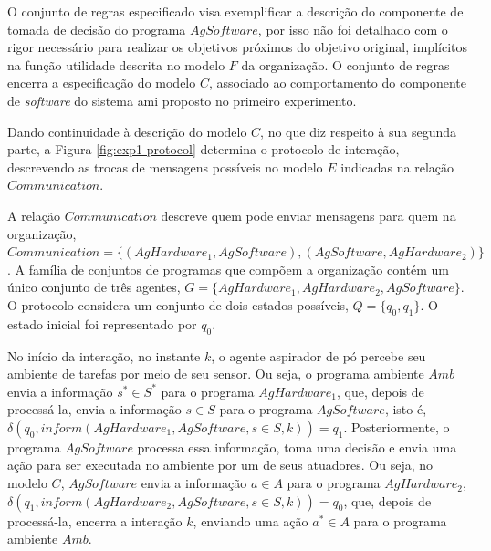 O conjunto de regras especificado visa exemplificar a descrição do componente de tomada de decisão do programa $AgSoftware$, por isso não foi detalhado com o rigor necessário para realizar os objetivos próximos do objetivo original, implícitos na função utilidade descrita no modelo $F$ da organização. O conjunto de regras encerra a especificação do modelo $C$, associado ao comportamento do componente de \textit{software} do sistema \acrshort{ami} proposto no primeiro experimento.

Dando continuidade à descrição do modelo $C$, no que diz respeito à sua segunda parte, a Figura \ref{fig:exp1-protocol} determina o protocolo de interação, descrevendo as trocas de mensagens possíveis no modelo $E$ indicadas na relação $Communication$.

\begin{figure}[h!]
    \centering
\end{figure}

A relação $Communication$ descreve quem pode enviar mensagens para quem na organização, $Communication = \{(AgHardware_1, AgSoftware), (AgSoftware, AgHardware_2)\}$. A família de conjuntos de programas que compõem a organização contém um único conjunto de três agentes, $G = \{{AgHardware_1, AgHardware_2, AgSoftware}\}$. O protocolo considera um conjunto de dois estados possíveis, $Q = \{q_0, q_1\}$. O estado inicial foi representado por $q_0$.

No início da interação, no instante $k$, o agente aspirador de pó percebe seu ambiente de tarefas por meio de seu sensor. Ou seja, o programa ambiente $Amb$ envia a informação $s^* \in S^*$ para o programa $AgHardware_1$, que, depois de processá-la, envia a informação $s \in S$ para o programa $AgSoftware$, isto é, $\delta(q_0, inform(AgHardware_1, AgSoftware, s \in S, k)) = q_1$. Posteriormente, o programa $AgSoftware$ processa essa informação, toma uma decisão e envia uma ação para ser executada no ambiente por um de seus atuadores. Ou seja, no modelo $C$, $AgSoftware$ envia a informação $a \in A$ para o programa $AgHardware_2$, $\delta(q_1, inform(AgHardware_2, AgSoftware, s \in S, k)) = q_0$, que, depois de processá-la, encerra a interação $k$, enviando uma ação $a^* \in A$ para o programa ambiente $Amb$.

